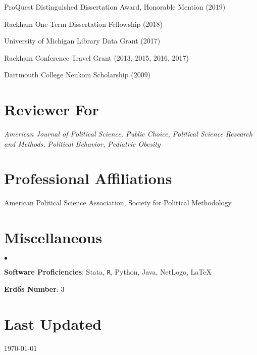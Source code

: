 \documentclass[margin,line]{res}
\newenvironment{list2}{
  \begin{list}{$\bullet$}{%
      \setlength{\itemsep}{0in}
      \setlength{\parsep}{0in} \setlength{\parskip}{0in}
      \setlength{\topsep}{0in} \setlength{\partopsep}{0in} 
      \setlength{\leftmargin}{0.2in}}}{\end{list}}
\begin{document}
\begin{resume}
ProQuest Distinguished Dissertation Award, Honorable Mention (2019)

Rackham One-Term Dissertation Fellowship (2018)

University of Michigan Library Data Grant (2017)

Rackham Conference Travel Grant (2013, 2015, 2016, 2017)

Dartmouth College Neukom Scholarship (2009)



\section{\sc Reviewer For}
\textit{American Journal of Political Science, Public Choice, Political Science Research and Methods, Political Behavior, Pediatric Obesity}

\section{\sc Professional Affiliations}
American Political Science Association, Society for Political Methodology





\section{\sc Miscellaneous}
\begin{list2}
	\item \textbf{Software Proficiencies}: Stata, {\tt R}, Python, Java, NetLogo, \LaTeX
	\item \textbf{Erd{\H o}s Number}: 3
\end{list2}


\section{\sc Last Updated}
\today

%

\end{resume}
\end{document}

